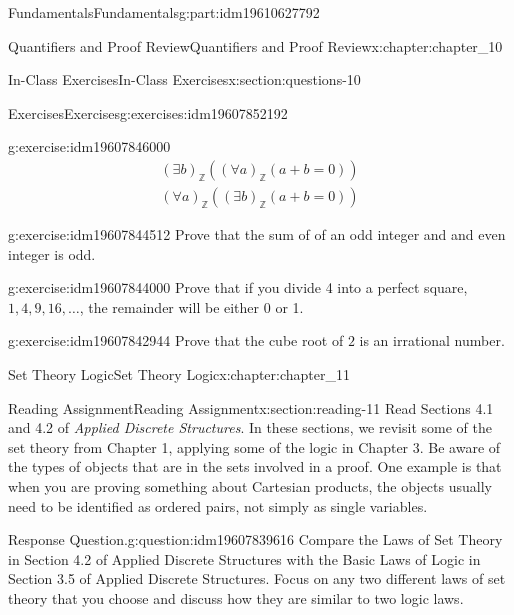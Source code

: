 \documentclass[oneside,10pt,]{book}
\numberwithin{equation}{section}
\begin{document}
\begin{partptx}{Fundamentals}{}{Fundamentals}{}{}{g:part:idm19610627792}
\begin{chapterptx}{Quantifiers and Proof Review}{}{Quantifiers and Proof Review}{}{}{x:chapter:chapter_10}
\begin{sectionptx}{In-Class Exercises}{}{In-Class Exercises}{}{}{x:section:questions-10}
\begin{exercises-subsection-numberless}{Exercises}{}{Exercises}{}{}{g:exercises:idm19607852192}
\begin{exercisegroup}
\begin{divisionexerciseeg}{3}{}{}{g:exercise:idm19607846000}
\begin{gather*}
(\exists  b)_{\mathbb{Z}} ((\forall a)_{\mathbb{Z}}(a + b = 0))\\
(\forall  a)_{\mathbb{Z}} ((\exists b)_{\mathbb{Z}}(a + b = 0))
\end{gather*}
%
\end{divisionexerciseeg}%
\begin{divisionexerciseeg}{4}{}{}{g:exercise:idm19607844512}%
Prove that the sum of of an odd integer and and even integer is odd.%
\end{divisionexerciseeg}%
\begin{divisionexerciseeg}{5}{}{}{g:exercise:idm19607844000}%
Prove that if you divide 4 into a perfect square, \(1, 4, 9, 16, \dots\), the remainder will be either 0 or 1.%
\end{divisionexerciseeg}%
\begin{divisionexerciseeg}{6}{}{}{g:exercise:idm19607842944}%
Prove that the cube root of \(2\) is an irrational number.%
\end{divisionexerciseeg}%
\end{exercisegroup}
\par\medskip\noindent
\end{exercises-subsection-numberless}
\end{sectionptx}
\end{chapterptx}
%
\typeout{************************************************}
\typeout{************************************************}
%
\begin{chapterptx}{Set Theory Logic}{}{Set Theory Logic}{}{}{x:chapter:chapter_11}
%
%
\typeout{************************************************}
\typeout{************************************************}
%
\begin{sectionptx}{Reading Assignment}{}{Reading Assignment}{}{}{x:section:reading-11}
Read Sections 4.1  and 4.2 of \emph{Applied Discrete Structures}.  In these sections, we revisit some of the set theory from Chapter 1, applying some of the logic in Chapter 3. Be aware of the types of objects that are in the sets involved in a proof.  One example is that when you are proving something about Cartesian products, the objects usually need to be identified as ordered pairs, not simply as single variables.%
\begin{question}{Response Question.}{g:question:idm19607839616}%
Compare the Laws of Set Theory in Section 4.2 of Applied Discrete Structures with the Basic Laws of Logic in Section 3.5 of Applied Discrete Structures.  Focus on any two different laws of set theory that you choose and discuss how they are similar to two logic laws.%

\end{question}
\end{sectionptx}
\end{chapterptx}
\end{partptx}
\end{document}

